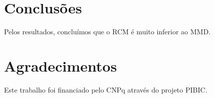 \section{Conclusões}
Pelos resultados, concluímos que o RCM é muito inferior ao MMD.

\section*{Agradecimentos}
Este trabalho foi financiado pelo CNPq através do projeto PIBIC.
